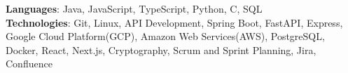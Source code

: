     \begin{itemize}[leftmargin=0.15in, label={}]
	\small{\item{
		\textbf{Languages}{: Java, JavaScript, TypeScript, Python, C, SQL} \\
		\textbf{Technologies}{:  Git, Linux, API Development, Spring Boot, FastAPI, Express, Google Cloud Platform(GCP), Amazon Web Services(AWS), PostgreSQL, Docker, React, Next.js, Cryptography, Scrum and Sprint Planning, Jira, Confluence} \\
	}}
    \end{itemize}